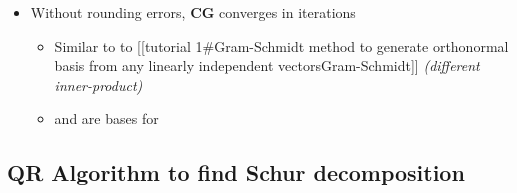 \begin{itemize}
\begin{itemize}
                \begin{itemize}

                  \item
                         =\textgreater{}
                  \item
                         =\textgreater{}
                  \item
                \end{itemize}
          \item
                Without rounding errors, \textbf{CG} converges in 
                iterations

                \begin{itemize}

                  \item
                        Similar to to {[}{[}tutorial 1\#Gram-Schmidt method to generate
                        orthonormal basis from any linearly independent
                        vectors\textbar Gram-Schmidt{]}{]} \emph{(different
                          inner-product)}
                  \item
                        and
                        are bases for 
                \end{itemize}
        \end{itemize}
\end{itemize}

\subsection*{\texorpdfstring{QR Algorithm to find Schur decomposition
    }{QR Algorithm to find Schur decomposition }}

